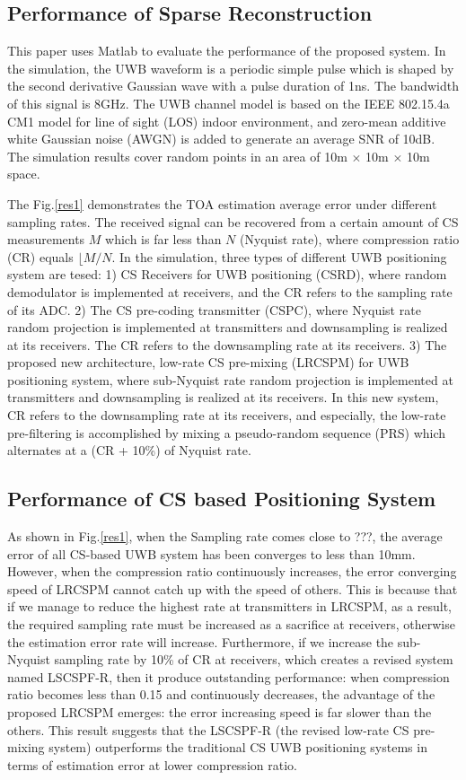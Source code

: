 \subsection{Performance of Sparse Reconstruction}
This paper uses Matlab to evaluate the performance of the proposed system. In the simulation, the UWB waveform is a periodic simple pulse which is shaped by the second derivative Gaussian wave with a pulse duration of 1ns. The bandwidth of this signal is 8GHz. The UWB channel model is based on the IEEE 802.15.4a CM1 model for line of sight (LOS) indoor environment, and zero-mean additive white Gaussian noise (AWGN) is added to generate an average SNR of 10dB. The simulation results cover random points in an area of 10m $\times$ 10m $\times$ 10m space.

The Fig.\ref{res1} demonstrates the TOA estimation average error under different sampling rates. The received signal can be recovered from a certain amount of CS measurements $M$ which is far less than $N$ (Nyquist rate), where compression ratio (CR) equals $\lfloor{M/N}$. In the simulation, three types of different UWB positioning system are tesed: 1) CS Receivers for UWB positioning (CSRD), where random demodulator is implemented at receivers, and the CR refers to the sampling rate of its ADC. 2) The CS pre-coding transmitter (CSPC), where Nyquist rate random projection is implemented at transmitters and downsampling is realized at its receivers. The CR refers to the downsampling rate at its receivers. 3) The proposed new architecture, low-rate CS pre-mixing (LRCSPM) for UWB positioning system, where sub-Nyquist rate random projection is implemented at transmitters and downsampling is realized at its receivers. In this new system, CR refers to the downsampling rate at its receivers, and especially, the low-rate pre-filtering is accomplished by mixing a pseudo-random sequence (PRS) which alternates at a (CR + 10\%) of Nyquist rate.  

\subsection{Performance of CS based Positioning System}
As shown in Fig.\ref{res1}, when the Sampling rate comes close to ???, the average error of all CS-based UWB system has been converges to less than 10mm. However, when the compression ratio continuously increases, the error converging speed of LRCSPM cannot catch up with the speed of others. This is because that if we manage to reduce the highest rate at transmitters in LRCSPM, as a result, the required sampling rate must be increased as a sacrifice at receivers, otherwise the estimation error rate will increase. Furthermore, if we increase the sub-Nyquist sampling rate  by 10\% of CR at receivers, which creates a revised system named LSCSPF-R, then it produce outstanding performance: when compression ratio becomes less than 0.15 and continuously decreases, the advantage of the proposed LRCSPM emerges: the error increasing speed is far slower than the others. This result suggests that the LSCSPF-R (the revised low-rate CS pre-mixing system) outperforms the traditional CS UWB positioning systems in terms of estimation error at lower compression ratio. 

